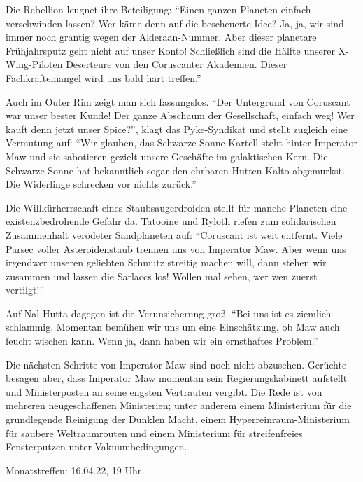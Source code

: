 \documentclass[final]{multiversum}
\begin{document}
Die Rebellion leugnet ihre Beteiligung: \enquote{Einen ganzen Planeten einfach verschwinden lassen? 
Wer käme denn auf die bescheuerte Idee? 
Ja, ja, wir sind immer noch grantig wegen der Alderaan-Nummer. 
Aber dieser planetare Frühjahrsputz geht nicht auf unser Konto! 
Schließlich sind die Hälfte unserer X-Wing-Piloten Deserteure von den Coruscanter Akademien. 
Dieser Fachkräftemangel wird uns bald hart treffen.}

Auch im Outer Rim zeigt man sich fassungslos. 
\enquote{Der Untergrund von Coruscant war unser bester Kunde! 
Der ganze Abschaum der Gesellschaft, einfach weg! 
Wer kauft denn jetzt unser Spice?}, klagt das Pyke-Syndikat und stellt zugleich eine Vermutung auf: 
\enquote{Wir glauben, das Schwarze-Sonne-Kartell steht hinter Imperator Maw und sie sabotieren gezielt unsere Geschäfte im galaktischen Kern. 
Die Schwarze Sonne hat bekanntlich sogar den ehrbaren Hutten Kalto abgemurkst. 
Die Widerlinge schrecken vor nichts zurück.}

Die Willkürherrschaft eines Staubsaugerdroiden stellt für manche Planeten eine existenzbedrohende Gefahr da. 
Tatooine und Ryloth riefen zum solidarischen Zusammenhalt verödeter Sandplaneten auf: 
\enquote{Coruscant ist weit entfernt. 
Viele Parsec voller Asteroidenstaub trennen uns von Imperator Maw. 
Aber wenn uns irgendwer unseren geliebten Schmutz streitig machen will, dann stehen wir zusammen und lassen die Sarlaccs los! 
Wollen mal sehen, wer wen zuerst vertilgt!}

Auf Nal Hutta dagegen ist die Verunsicherung groß. 
\enquote{Bei uns ist es ziemlich schlammig. 
Momentan bemühen wir uns um eine Einschätzung, ob Maw auch feucht wischen kann. 
Wenn ja, dann haben wir ein ernsthaftes Problem.}

Die nächsten Schritte von Imperator Maw sind noch nicht abzusehen. 
Gerüchte besagen aber, dass Imperator Maw momentan sein Regierungskabinett aufstellt und Ministerposten an seine engsten Vertrauten vergibt. 
Die Rede ist von mehreren neugeschaffenen Ministerien; unter anderem einem Ministerium für die grundlegende Reinigung der Dunklen Macht, einem Hyperreinraum-Ministerium für saubere Weltraumrouten und einem Ministerium für streifenfreies Fensterputzen unter Vakuumbedingungen.



\begin{termine}
\item Monatstreffen: 16.04.22, 19 Uhr
\end{termine}
\impressum
\end{document}
